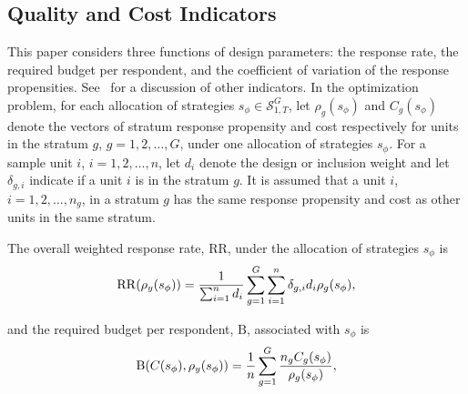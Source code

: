 \documentclass[12pt]{article}
\begin{document}
\subsection{Quality and Cost Indicators}
\label{subsec:quality-cost-indicators}

This paper considers three functions of design parameters: the response rate, the required budget per respondent, and the coefficient of variation of the response propensities.
See\unskip~ for a discussion of other indicators.
In the optimization problem, for each allocation of strategies $s_\phi \in \mathcal{S}^G_{1,T}$, let $\rho_g(s_\phi)$ and $C_g(s_\phi)$ denote the vectors of stratum response propensity and cost respectively for units in the stratum $g$, $g=1,2,\dots,G$, under one allocation of strategies $s_\phi$.
For a sample unit $i$, $i=1,2,\dots,n$, let $d_i$ denote the design or inclusion weight and let $\delta_{g,i}$ indicate if a unit $i$ is in the stratum $g$.
It is assumed that a unit $i$, $i=1,2,\dots,n_g$, in a stratum $g$ has the same response propensity and cost as other units in the same stratum.

The overall weighted response rate, $\mathrm{RR}$, under the allocation of strategies $s_\phi$ is
\let\saveeqnno\theequation
\let\savefrac\frac
\def\dispfrac{\displaystyle\savefrac}
\begin{eqnarray}
\let\frac\dispfrac
\gdef\theequation{13}
\let\theHequation\theequation
\label{equation-RR}
	\mathrm{RR}(\rho_y(s_\phi))=\dfrac{1}{\sum^n_{i=1}d_i}\sum^G_{g=1}\sum^n_{i=1}\delta_{g,i}d_i\rho_{g}(s_\phi),
\end{eqnarray}
\global\let\theequation\saveeqnno
\addtocounter{equation}{-1}\ignorespaces

and the required budget per respondent, $\mathrm{B}$, associated with $s_\phi$ is
\let\saveeqnno\theequation
\let\savefrac\frac
\def\dispfrac{\displaystyle\savefrac}
\begin{eqnarray}
\let\frac\dispfrac
\gdef\theequation{14}
\let\theHequation\theequation
\label{equation-B}
	\mathrm{B}(C(s_\phi),\rho_y(s_\phi))=\dfrac{1}{n}\sum^G_{g=1}\dfrac{n_gC_g(s_\phi)}{\rho_g(s_\phi)},
\end{eqnarray}
\global\let\theequation\saveeqnno
\addtocounter{equation}{-1}\ignorespaces
\end{document}
